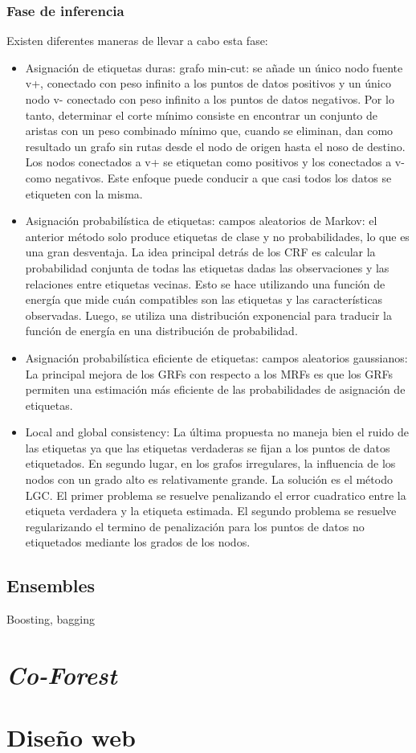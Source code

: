 \subsubsection{Fase de inferencia}
Existen diferentes maneras de llevar a cabo esta fase:
\begin{itemize}
	\item Asignación de etiquetas duras: grafo min-cut: se añade un único nodo fuente v+, conectado con peso infinito a los puntos de datos positivos y un único nodo v- conectado con peso infinito a los puntos de datos negativos. Por lo tanto, determinar el corte mínimo consiste en encontrar un conjunto de aristas con un peso combinado mínimo que, cuando se eliminan, dan como resultado un grafo sin rutas desde el nodo de origen hasta el noso de destino. Los nodos conectados a v+ se etiquetan como positivos y los conectados a v- como negativos. Este enfoque puede conducir a que casi todos los datos se etiqueten con la misma.
	\item Asignación probabilística de etiquetas: campos aleatorios de Markov: el anterior método solo produce etiquetas de clase y no probabilidades, lo que es una gran desventaja. La idea principal detrás de los CRF es calcular la probabilidad conjunta de todas las etiquetas dadas las observaciones y las relaciones entre etiquetas vecinas. Esto se hace utilizando una función de energía que mide cuán compatibles son las etiquetas y las características observadas. Luego, se utiliza una distribución exponencial para traducir la función de energía en una distribución de probabilidad.
	\item Asignación probabilística eficiente de etiquetas: campos aleatorios gaussianos: La principal mejora de los GRFs con respecto a los MRFs es que los GRFs permiten una estimación más eficiente de las probabilidades de asignación de etiquetas.
	\item Local and global consistency: La última propuesta no maneja bien el ruido de las etiquetas ya que las etiquetas verdaderas se fijan a los puntos de datos etiquetados. En segundo lugar, en los grafos irregulares, la influencia de los nodos con un grado alto es relativamente grande. La solución es el método LGC. El primer problema se resuelve penalizando el error cuadratico entre la etiqueta verdadera y la etiqueta estimada. El segundo problema se resuelve regularizando el termino de penalización para los puntos de datos no etiquetados mediante los grados de los nodos.
	
\end{itemize}


\subsection{Ensembles}
\cite{ensembles}
Boosting, bagging




\section{\textit{Co-Forest}}




\cite{IEEE:CoForest}

\section{Diseño web}




